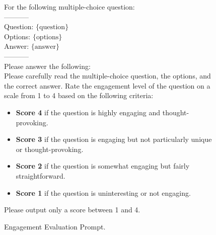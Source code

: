 \begin{figure}[h]
\centering
\begin{tcolorbox}[width=1\columnwidth, fontupper=\footnotesize,title=Engagement Evaluation Prompt]
\RaggedRight
\obeylines
{For the following multiple-choice question:\\
-----------\\
Question: $\{\text{question}\}$\\
\vspace{3mm}
Options: $\{\text{options}\}$\\
\vspace{3mm}
Answer: $\{\text{answer}\}$\\
-----------\\
Please answer the following:\\

Please carefully read the multiple-choice question, the options, and the correct answer.  
Rate the engagement level of the question on a scale from 1 to 4 based on the following criteria:
\begin{itemize}[label=-,nosep]
    \item \textbf{Score 4} if the question is highly engaging and thought-provoking.
    \item \textbf{Score 3} if the question is engaging but not particularly unique or thought-provoking.
    \item \textbf{Score 2} if the question is somewhat engaging but fairly straightforward.
    \item \textbf{Score 1} if the question is uninteresting or not engaging.
\end{itemize}

Please output only a score between 1 and 4.
}

\end{tcolorbox}
\caption{Engagement Evaluation Prompt.}
\label{fig:engagement_prompt}
\end{figure}
